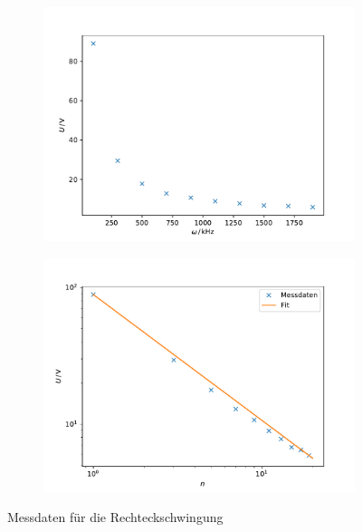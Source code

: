 \begin{figure}[h]
\begin{subfigure}{0.5\textwidth}
    \centering
    \includegraphics[width=\textwidth]{assets/rechteck_messung.pdf}
\end{subfigure}
\begin{subfigure}{0.5\textwidth}
    \centering
    \includegraphics[width=\textwidth]{assets/rechteck_log.pdf}
\end{subfigure}
\caption{Messdaten für die Rechteckschwingung}
\label{fig:rechteck_fit}
\end{figure}

